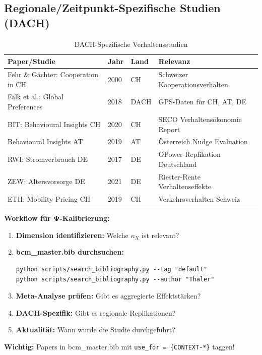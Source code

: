 \subsection{Regionale/Zeitpunkt-Spezifische Studien (DACH)}

\begin{table}[htbp]
\centering
\caption{DACH-Spezifische Verhaltensstudien}
\label{tab:dr-papers-dach}
\renewcommand{\arraystretch}{1.2}
\scriptsize
\begin{tabular}{@{}p{3cm}p{1.5cm}p{2cm}p{4.5cm}@{}}
\toprule
\textbf{Paper/Studie} & \textbf{Jahr} & \textbf{Land} & \textbf{Relevanz} \\
\midrule
Fehr \& Gächter: Cooperation in CH & 2000 & CH & Schweizer Kooperationsverhalten \\
Falk et al.: Global Preferences & 2018 & DACH & GPS-Daten für CH, AT, DE \\
BIT: Behavioural Insights CH & 2020 & CH & SECO Verhaltensökonomie Report \\
Behavioural Insights AT & 2019 & AT & Österreich Nudge Evaluation \\
RWI: Stromverbrauch DE & 2017 & DE & OPower-Replikation Deutschland \\
ZEW: Altersvorsorge DE & 2021 & DE & Riester-Rente Verhaltenseffekte \\
ETH: Mobility Pricing CH & 2019 & CH & Verkehrsverhalten Schweiz \\
\bottomrule
\end{tabular}
\end{table}

\begin{tcolorbox}[colback=yellow!5!white, colframe=yellow!75!black,
    title=\textbf{Paper-Suche für neue Kontextanalysen}]

\textbf{Workflow für Ψ-Kalibrierung:}
\begin{enumerate}[nosep]
    \item \textbf{Dimension identifizieren:} Welche $\kappa_X$ ist relevant?
    \item \textbf{bcm\_master.bib durchsuchen:}
    \begin{verbatim}
python scripts/search_bibliography.py --tag "default"
python scripts/search_bibliography.py --author "Thaler"
    \end{verbatim}
    \item \textbf{Meta-Analyse prüfen:} Gibt es aggregierte Effektstärken?
    \item \textbf{DACH-Spezifik:} Gibt es regionale Replikationen?
    \item \textbf{Aktualität:} Wann wurde die Studie durchgeführt?
\end{enumerate}

\textbf{Wichtig:} Papers in bcm\_master.bib mit \texttt{use\_for = \{CONTEXT-*\}} taggen!

\end{tcolorbox}


